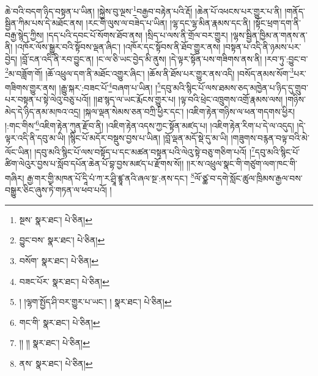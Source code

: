 ཆེ་བའི་བདག་ཉིད་བསྟན་པ་ཡིན། །སྐྱེས་བུ་ལྔས་\footnote{སྔས་  སྣར་ཐང་།  པེ་ཅིན། }བརྒྱབ་བརྟེན་པའི་རྡོ། །ཆེན་པོ་འཕངས་པར་གྱུར་པ་ནི། །གནོད་སྦྱིན་ཀིམ་པས་དེ་མཐོང་ནས། །རང་གི་ལུས་ལ་བཟེད་པ་ཡིན། །ལྷ་དང་ལྷ་མིན་རྣམས་དང་ནི། །སྟོང་ཕྲག་དག་ནི་བརྒྱ་སྙེད་ཀྱིས། །དད་པའི་དབང་པོ་སོགས་ཐོབ་ནས། །སྲིད་པ་ལས་ནི་གྲོལ་བར་གྱུར། །ལྷས་སྦྱིན་ཁྱིམ་ན་གནས་ན་ནི། །འཁོར་ལོས་སྒྱུར་བའི་སྟོབས་ལྡན་ཞིང་། །འཁོར་དང་སྟོབས་ནི་ཐོབ་གྱུར་ནས། །བསྟན་པ་འདི་ནི་ཉམས་པར་བྱེད། །བློ་ངན་འདི་ནི་རབ་བྱུང་ན། །ང་ལ་ཅི་ཡང་བྱེད་མི་ནུས། །དེ་ལྟར་སྟོན་པས་གཟིགས་ནས་ནི། །རབ་ཏུ་:བྱུང་བ་\footnote{བྱུང་བས་  སྣར་ཐང་།  པེ་ཅིན། }མ་བཟློག་གོ། །ཆོ་འཕྲུལ་དག་ནི་མཐོང་འགྱུར་ཞིང་། །ཆོས་ནི་ཐོས་པར་གྱུར་ནས་འདི། །བསོད་ནམས་སོག་\footnote{བསོག་  སྣར་ཐང་།  པེ་ཅིན། }པར་གཟིགས་གྱུར་ནས། །རྒྱུ་སྐར་:བཟང་པོ་\footnote{བཟང་པོར་  སྣར་ཐང་།  པེ་ཅིན། }བཞག་པ་ཡིན། །\footnote{། །ལྷག་སྤྱོད་ཤི་བར་གྱུར་པ་ཡང་། །  སྣར་ཐང་།  པེ་ཅིན། }དབུ་མའི་སྙིང་པོ་ལས་ཐམས་ཅད་མཁྱེན་པ་ཉིད་དུ་གྲུབ་པར་བསྟན་པ་སྟེ་ལེའུ་བཅུ་པའོ།། །།ཐ་སྙད་ལ་ཡང་རྨོངས་གྱུར་པ། །ལྟ་བའི་ཕྲེང་འཁྲུགས་འགྲོ་རྣམས་ལས། །གཉིས་མེད་དེ་ཉིད་ནམ་མཁའ་འདྲ། །སྐལ་ལྡན་སེམས་ཅན་བཀྲི་ཕྱིར་དང་། །འཇིག་རྟེན་གཉིས་ལ་ཕན་གདགས་ཕྱིར། །:གང་གིས་\footnote{གང་གི་  སྣར་ཐང་།  པེ་ཅིན། }འཇིག་རྟེན་ཀུན་རྫོབ་ནི། །འཇིག་རྟེན་འདས་ཀྱང་སྟོན་མཛད་པ། །འཇིག་རྟེན་རིག་པ་དེ་ལ་འདུད། །དེ་ལྟར་འདི་ནི་དབུ་མ་ཡི། །སྙིང་པོ་མདོར་བསྡུས་བྱས་པ་ཡིན། །བློ་ལྡན་མདོ་སྡེ་དུ་མ་ཡི། །གཟུགས་བརྙན་བལྟ་བའི་མེ་ལོང་ཡིན། །དབུ་མའི་སྙིང་པོ་ལས་བསྟོད་པ་དང་མཚན་བསྟན་པའི་ལེའུ་སྟེ་བཅུ་གཅིག་པའོ། །\footnote{།། །།  སྣར་ཐང་།  པེ་ཅིན། }དབུ་མའི་སྙིང་པོ་ཚིག་ལེའུར་བྱས་པ་སློབ་དཔོན་ཆེན་པོ་བྷ་བྱས་མཛད་པ་རྫོགས་སོ།། །།ར་ས་འཕྲུལ་སྣང་གི་གཙུག་ལག་ཁང་གི་གཞིར། རྒྱ་གར་གྱི་མཁན་པོ་དཱི་པཾ་ཀ་ར་ཤྲཱི་ཛྙཱ་ནའི་ཞལ་སྔ་:ནས་དང་། \footnote{ནས་  སྣར་ཐང་།  པེ་ཅིན། }ལོ་ཙྪ་བ་དགེ་སློང་ཚུལ་ཁྲིམས་རྒྱལ་བས་བསྒྱུར་ཅིང་ཞུས་ཏེ་གཏན་ལ་ཕབ་པའོ། ། 